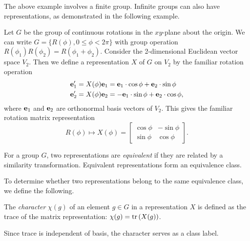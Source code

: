 The above example involves a finite group. Infinite groups can also have representations, as demonstrated in the following example.
\begin{example}
    Let $G$ be the group of continuous rotations in the $xy$-plane about the origin. We can write $G = \{R(\phi),0\leq\phi<2\pi\}$ with group operation $R(\phi_1)R(\phi_2) = R(\phi_1+\phi_2)$. Consider the 2-dimensional Euclidean vector space $V_2$. Then we define a representation $X$ of $G$ on $V_2$ by the familiar rotation operation
    \begin{align}
        \mathbf{e}_1' &= X(\phi)\mathbf{e}_1 = \mathbf{e}_1\cdot\cos\phi + \mathbf{e}_2\cdot\sin\phi\\
        \mathbf{e}_2' &= X(\phi)\mathbf{e}_2 = -\mathbf{e}_1\cdot\sin\phi + \mathbf{e}_2\cdot\cos\phi,
    \end{align}
    where $\mathbf{e}_1$ and $\mathbf{e}_2$ are orthonormal basis vectors of $V_2$. This gives the familiar rotation matrix representation
    \begin{equation}
        R(\phi) \mapsto X(\phi) = \begin{bmatrix}
            \cos\phi & -\sin\phi\\
            \sin\phi & \cos\phi
        \end{bmatrix}.
    \end{equation}
\end{example}

\begin{definition}
    For a group $G$, two representations are \textit{equivalent} if they are related by a similarity transformation. Equivalent representations form an equivalence class.
\end{definition}

To determine whether two representations belong to the same equivalence class, we define the following.
\begin{definition}
    The \textit{character} $\chi(g)$ of an element $g\in G$ in a representation $X$ is defined as the trace of the matrix representation: $\chi(g) = \textrm{tr}\left(X(g)\right)$.
\end{definition}
Since trace is independent of basis, the character serves as a class label.

